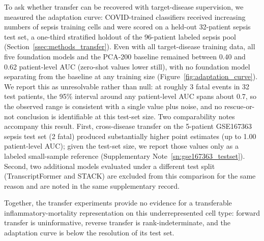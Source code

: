 To ask whether transfer can be recovered with target-disease supervision, we
measured the adaptation curve: COVID-trained classifiers received increasing
numbers of sepsis training cells and were scored on a held-out 32-patient
sepsis test set, a one-third stratified holdout of the 96-patient labeled
sepsis pool (Section~\ref{ssec:methods_transfer}). Even with all
target-disease training data, all five foundation models and the PCA-200
baseline remained between 0.40 and 0.62 patient-level AUC (zero-shot values
lower still), with no foundation model separating from the baseline at any
training size (Figure~\ref{fig:adaptation_curve}). We report this as
unresolvable rather than null: at roughly 3 fatal events in 32 test patients,
the 95\% interval around any patient-level AUC spans about 0.7, so the
observed range is consistent with a single value plus noise, and no
rescue-or-not conclusion is identifiable at this test-set size. Two
comparability notes accompany this result. First, cross-disease
transfer on the 5-patient GSE167363 sepsis test set (2 fatal) produced
substantially higher point estimates (up to 1.00 patient-level AUC); given
the test-set size, we report those values
only as a labeled small-sample reference (Supplementary Note~\ref{sn:gse167363_testset}). Second, two additional
models evaluated under a different test split (TranscriptFormer and STACK) are
excluded from this comparison for the same reason and are noted in the same
supplementary record.

Together, the transfer experiments provide no evidence for a transferable
inflammatory-mortality representation on this underrepresented cell type:
forward transfer is uninformative, reverse transfer is rank-indeterminate,
and the adaptation curve is below the resolution of its test set.
